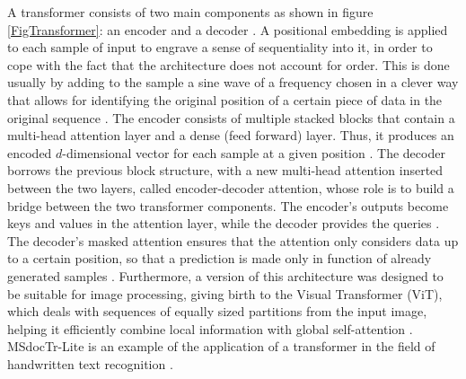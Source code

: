 A transformer consists of two main components as shown in figure \ref{FigTransformer}: an encoder and a decoder \cite{transformer}. A positional embedding is applied to each sample of input to engrave a sense of sequentiality into it, in order to cope with the fact that the architecture does not account for order. This is done usually by adding to the sample a sine wave of a frequency chosen in a clever way that allows for identifying the original position of a certain piece of data in the original sequence \cite{transformer}. The encoder consists of multiple stacked blocks that contain a multi-head attention layer and a dense (feed forward) layer. Thus, it produces an encoded $d$-dimensional vector for each sample at a given position \cite{D2l}. The decoder borrows the previous block structure, with a new multi-head attention inserted between the two layers, called encoder-decoder attention, whose role is to build a bridge between the two transformer components. The encoder's outputs become keys and values in the attention layer, while the decoder provides the queries \cite{D2l}. The decoder's masked attention ensures that the attention only considers data up to a certain position, so that a prediction is made only in function of already generated samples \cite{D2l}. Furthermore, a version of this architecture was designed to be suitable for image processing, giving birth to the Visual Transformer (ViT), which deals with sequences of equally sized partitions from the input image, helping it efficiently combine local information with global self-attention \cite{vit}. MSdocTr-Lite is an example of the application of a transformer in the field of handwritten text recognition \cite{msdoctrlite}.